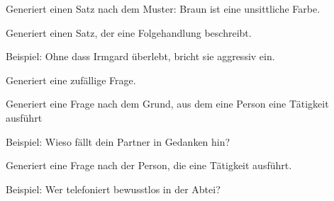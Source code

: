\documentclass[a4paper,12pt,oneside]{sphinxmanual}
\begin{document}

\begin{fulllineitems}
\label{funktionen:pyzufall.satz_farbe}
Generiert einen Satz nach dem Muster: Braun ist eine unsittliche Farbe.

\end{fulllineitems}


\begin{fulllineitems}
\label{funktionen:pyzufall.satz_folgehandlung}
Generiert einen Satz, der eine Folgehandlung beschreibt.

Beispiel: Ohne dass Irmgard überlebt, bricht sie aggressiv ein.

\end{fulllineitems}


\begin{fulllineitems}
\label{funktionen:pyzufall.satz_frage}
Generiert eine zufällige Frage.

\end{fulllineitems}


\begin{fulllineitems}
\label{funktionen:pyzufall.satz_frage_1}
Generiert eine Frage nach dem Grund, aus dem eine Person eine Tätigkeit ausführt

Beispiel: Wieso fällt dein Partner in Gedanken hin?

\end{fulllineitems}


\begin{fulllineitems}
\label{funktionen:pyzufall.satz_frage_2}
Generiert eine Frage nach der Person, die eine Tätigkeit ausführt.

Beispiel: Wer telefoniert bewusstlos in der Abtei?

\end{fulllineitems}
\end{document}
